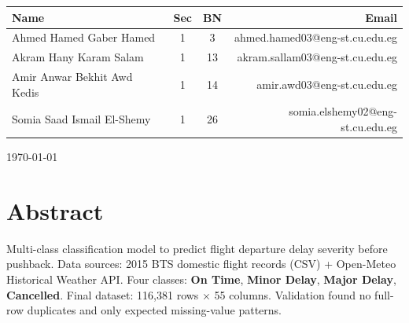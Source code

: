 \documentclass{article}
\begin{document}
\begin{titlepage}
    \begin{center}
        \begin{tcolorbox}
            \renewcommand{\arraystretch}{1.5}
            \begin{tabularx}{\textwidth}{X c c r}
                \textbf{\textcolor{accentgold}{Name}} &
                \textbf{\textcolor{accentgold}{Sec}} &
                \textbf{\textcolor{accentgold}{BN}} &
                \textbf{\textcolor{accentgold}{Email}} \\
                \midrule
                Ahmed Hamed Gaber Hamed     & \textcolor{secondarygrey}{1} & \textcolor{secondarygrey}{3}  & \textcolor{secondarygrey}{ahmed.hamed03@eng-st.cu.edu.eg} \\
                Akram Hany Karam Salam      & \textcolor{secondarygrey}{1} & \textcolor{secondarygrey}{13} & \textcolor{secondarygrey}{akram.sallam03@eng-st.cu.edu.eg} \\
                Amir Anwar Bekhit Awd Kedis & \textcolor{secondarygrey}{1} & \textcolor{secondarygrey}{14} & \textcolor{secondarygrey}{amir.awd03@eng-st.cu.edu.eg} \\
                Somia Saad Ismail El-Shemy  & \textcolor{secondarygrey}{1} & \textcolor{secondarygrey}{26} & \textcolor{secondarygrey}{somia.elshemy02@eng-st.cu.edu.eg} \\
            \end{tabularx}
        \end{tcolorbox}
    \end{center}

    \begin{center}
        \vspace{1.5cm}
        {\large \today \par}
    \end{center}

    \vfill
\end{titlepage}

\newpage
\setcounter{page}{1}
\tableofcontents
\newpage

\section{\textcolor{accentblue}{Abstract}}

Multi-class classification model to predict flight departure delay severity before pushback. Data sources: 2015 BTS domestic flight records (CSV) + Open-Meteo Historical Weather API. Four classes: \textbf{On Time}, \textbf{Minor Delay}, \textbf{Major Delay}, \textbf{Cancelled}. Final dataset: 116,381 rows $\times$ 55 columns. Validation found no full-row duplicates and only expected missing-value patterns.
\end{document}
